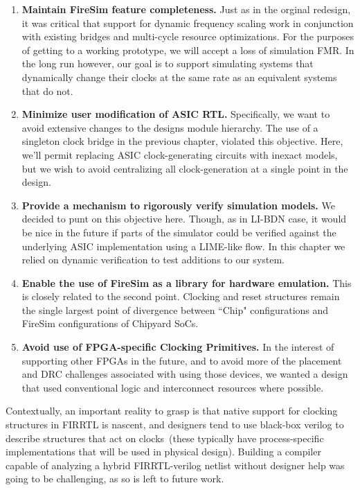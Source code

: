 \begin{enumerate}
\item \textbf{Maintain FireSim feature completeness.} Just as in the orginal
redesign, it was critical that support for dynamic frequency scaling work in
conjunction with existing bridges and multi-cycle resource optimizations. For
the purposes of getting to a working prototype, we will accept a loss of
simulation FMR. In the long run however, our goal is to support simulating
systems that dynamically change their clocks at the same rate as an equivalent
systems that do not.

\item \textbf{Minimize user modification of ASIC RTL.}
Specifically, we want to avoid extensive changes to the designs module
    hierarchy. The use of a singleton clock bridge in the previous chapter,
    violated this objective. Here, we'll permit replacing ASIC
    clock-generating circuits with inexact models, but we wish to avoid
    centralizing all clock-generation at a single point in the design.

\item \textbf{Provide a mechanism to rigorously verify simulation models.} We
decided to punt on this objective here. Though, as in LI-BDN case, it would be
nice in the future if parts of the simulator could be verified against the
underlying ASIC implementation using a LIME-like flow. In this chapter
we relied on dynamic verification to test additions to our system.

\item \textbf{Enable the use of FireSim as a library for hardware emulation.}
This is closely related to the second point. Clocking and reset structures
remain the single largest point of divergence between ``Chip" configurations and
FireSim configurations of Chipyard SoCs.

\item \textbf{Avoid use of FPGA-specific Clocking Primitives.}
In the interest of supporting other FPGAs in the future, and to avoid more of
the placement and DRC challenges associated with using those devices,
we wanted a design that used conventional logic and interconnect
resources where possible.
\end{enumerate}

Contextually, an important reality to grasp is that native support for clocking
structures in FIRRTL is nascent, and designers tend to use black-box verilog to
describe structures that act on clocks~(these typically have process-specific
implementations that will be used in physical design). Building a compiler
capable of analyzing a hybrid FIRRTL-verilog netlist without designer help was
going to be challenging, as so is left to future work.

